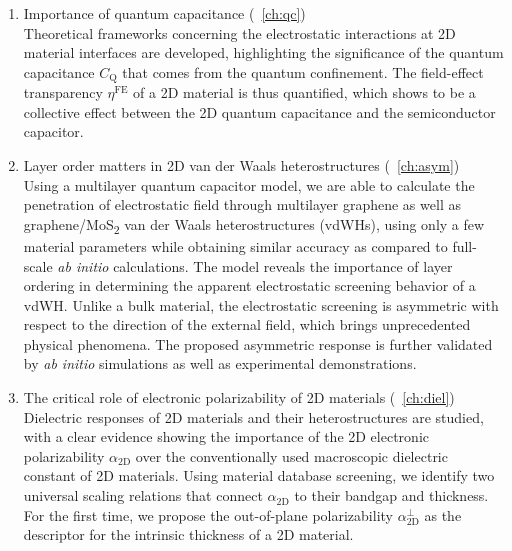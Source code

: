 \begin{enumerate}
\item Importance of quantum capacitance (~\autoref{ch:qc})\\
  Theoretical frameworks concerning the electrostatic interactions at
  2D material interfaces are developed, highlighting the significance
  of the quantum capacitance $C_{\mathrm{Q}}$ that comes from the
  quantum confinement. The field-effect transparency
  $\eta^{\mathrm{FE}}$ of a 2D material is thus quantified, which
  shows to be a collective effect between the 2D quantum capacitance
  and the semiconductor capacitor.

  
\item Layer order matters in 2D van der Waals heterostructures (~\autoref{ch:asym})\\
  Using a multilayer quantum capacitor model, we are able to calculate
  the penetration of electrostatic field through multilayer graphene
  as well as graphene/MoS\textsubscript{2} van der Waals
  heterostructures (vdWHs), using only a few material parameters while
  obtaining similar accuracy as compared to full-scale \textit{ab
    initio} calculations. The model reveals the importance of layer
  ordering in determining the apparent electrostatic screening
  behavior of a vdWH. Unlike a bulk material, the electrostatic
  screening is asymmetric with respect to the direction of the
  external field, which brings unprecedented physical phenomena. The
  proposed asymmetric response is further validated by \textit{ab
    initio} simulations as well as experimental demonstrations.
  
\item The critical role of electronic polarizability of 2D materials
  (~\autoref{ch:diel})\\
  Dielectric responses of 2D materials and their heterostructures are
  studied, with a clear evidence showing the importance of the 2D
  electronic polarizability $\alpha_{\mathrm{2D}}$ over the
  conventionally used macroscopic dielectric constant of 2D
  materials. Using material database screening, we identify two
  universal scaling relations that connect $\alpha_{\mathrm{2D}}$ to
  their bandgap and thickness. For the first time, we propose the
  out-of-plane polarizability $\alpha_{\mathrm{2D}}^{\perp}$ as the
  descriptor for the intrinsic thickness of a 2D material.


\end{enumerate}
